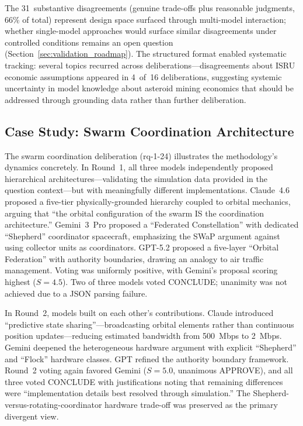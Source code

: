 \documentclass[11pt,a4paper]{article}
\begin{document}
The 31~substantive disagreements (genuine trade-offs plus reasonable judgments, 66\% of total) represent design space surfaced through multi-model interaction; whether single-model approaches would surface similar disagreements under controlled conditions remains an open question (Section~\ref{sec:validation_roadmap}). The structured format enabled systematic tracking: several topics recurred across deliberations---disagreements about ISRU economic assumptions appeared in 4~of~16 deliberations, suggesting systemic uncertainty in model knowledge about asteroid mining economics that should be addressed through grounding data rather than further deliberation.

\subsection{Case Study: Swarm Coordination Architecture}

The swarm coordination deliberation (rq-1-24) illustrates the methodology's dynamics concretely. In Round~1, all three models independently proposed hierarchical architectures---validating the simulation data provided in the question context---but with meaningfully different implementations. Claude~4.6 proposed a five-tier physically-grounded hierarchy coupled to orbital mechanics, arguing that ``the orbital configuration of the swarm IS the coordination architecture.'' Gemini~3~Pro proposed a ``Federated Constellation'' with dedicated ``Shepherd'' coordinator spacecraft, emphasizing the SWaP argument against using collector units as coordinators. GPT-5.2 proposed a five-layer ``Orbital Federation'' with authority boundaries, drawing an analogy to air traffic management. Voting was uniformly positive, with Gemini's proposal scoring highest ($S = 4.5$). Two of three models voted CONCLUDE; unanimity was not achieved due to a JSON parsing failure.

In Round~2, models built on each other's contributions. Claude introduced ``predictive state sharing''---broadcasting orbital elements rather than continuous position updates---reducing estimated bandwidth from 500~Mbps to 2~Mbps. Gemini deepened the heterogeneous hardware argument with explicit ``Shepherd'' and ``Flock'' hardware classes. GPT refined the authority boundary framework. Round~2 voting again favored Gemini ($S = 5.0$, unanimous APPROVE), and all three voted CONCLUDE with justifications noting that remaining differences were ``implementation details best resolved through simulation.'' The Shepherd-versus-rotating-coordinator hardware trade-off was preserved as the primary divergent view.
\end{document}
